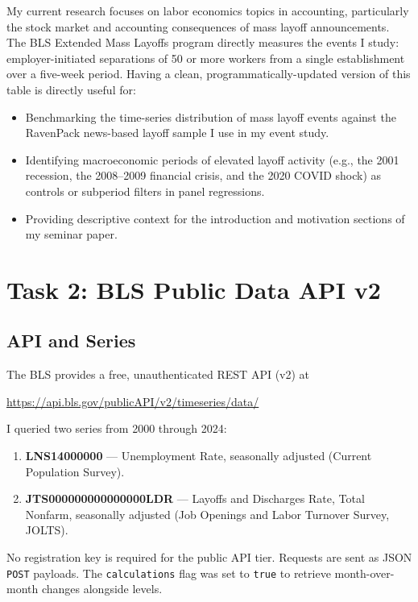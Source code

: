 \documentclass[12pt]{article}
\begin{document}
My current research focuses on labor economics topics in accounting, particularly
the stock market and accounting consequences of mass layoff announcements. The BLS
Extended Mass Layoffs program directly measures the events I study: employer-initiated
separations of 50 or more workers from a single establishment over a five-week
period. Having a clean, programmatically-updated version of this table is directly
useful for:
\begin{itemize}
    \item Benchmarking the time-series distribution of mass layoff events against
          the RavenPack news-based layoff sample I use in my event study.
    \item Identifying macroeconomic periods of elevated layoff activity (e.g.,
          the 2001 recession, the 2008--2009 financial crisis, and the 2020
          COVID shock) as controls or subperiod filters in panel regressions.
    \item Providing descriptive context for the introduction and motivation
          sections of my seminar paper.
\end{itemize}

\section{Task 2: BLS Public Data API v2}

\subsection*{API and Series}

The BLS provides a free, unauthenticated REST API (v2) at
\begin{center}
\url{https://api.bls.gov/publicAPI/v2/timeseries/data/}
\end{center}
I queried two series from 2000 through 2024:
\begin{enumerate}
    \item \textbf{LNS14000000} --- Unemployment Rate, seasonally adjusted
          (Current Population Survey).
    \item \textbf{JTS000000000000000LDR} --- Layoffs and Discharges Rate,
          Total Nonfarm, seasonally adjusted (Job Openings and Labor Turnover
          Survey, JOLTS).
\end{enumerate}
No registration key is required for the public API tier. Requests are sent as
JSON \texttt{POST} payloads. The \texttt{calculations} flag was set to
\texttt{true} to retrieve month-over-month changes alongside levels.
\end{document}
